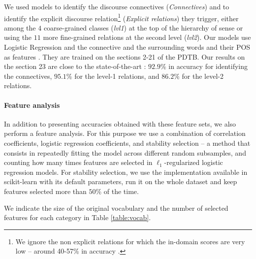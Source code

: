 \documentclass[11pt,letterpaper]{article}
\begin{document}
We used models to identify the discourse connectives (\textit{Connectives}) and to identify the explicit discourse relation\footnote{We ignore the non explicit relations for which the in-domain scores are very low -- around 40-57\% in accuracy \cite{rutherford:improving:2015,lin:pdtb:2014}.} (\textit{Explicit relations}) they trigger, either among the $4$ coarse-grained classes (\textit{lvl1}) at the top of the hierarchy of sense
or using the $11$ more fine-grained relations at the second level  (\textit{lvl2}).
Our models use Logistic Regression and the connective and the surrounding words and their POS as features \cite{lin:recognizing:2009}. 
They are trained on the sections 2-21 of the PDTB.
Our results on the section 23 are close to the state-of-the-art \cite{pitler:using:2009,pitler:easily:2008,lin:pdtb:2014}: 
$92.9$\% in accuracy for identifying the connectives, $95.1$\% for the level-1 relations, and $86.2$\% for the level-2 relations.


\paragraph{Feature analysis}

In addition to presenting accuracies obtained with these feature sets, we also perform a feature analysis. For this purpose we use a combination of correlation coefficients, logistic regression coefficients, and stability selection
\cite{meinshausen2010stability} -- a method that consists in repeatedly fitting the model across different random subsamples, and counting how many times features are selected in $\ell_1$-regularized logistic regression models. 
For stability selection, we use the implementation available in scikit-learn \cite{scikit-learn} with its default parameters, run it on the whole dataset and keep features selected more than $50$\% of the time.

We indicate the size of the original vocabulary and the number of selected features for each category in Table \ref{table:vocab}.
\end{document}
